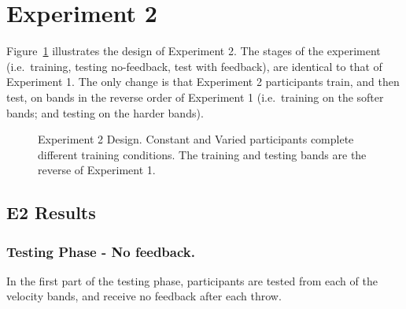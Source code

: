 \documentclass[
  letterpaper,
  DIV=11,
  numbers=noendperiod,
  oneside]{scrartcl}
\begin{document}
\section{Experiment 2}\label{experiment-2}

Figure~\ref{fig-design-e2} illustrates the design of Experiment 2. The
stages of the experiment (i.e.~training, testing no-feedback, test with
feedback), are identical to that of Experiment 1. The only change is
that Experiment 2 participants train, and then test, on bands in the
reverse order of Experiment 1 (i.e.~training on the softer bands; and
testing on the harder bands).

\begin{figure}


\caption{\label{fig-design-e2}Experiment 2 Design. Constant and Varied
participants complete different training conditions. The training and
testing bands are the reverse of Experiment 1.}

\end{figure}%

\subsection{E2 Results}\label{e2-results}

\subsubsection{Testing Phase - No
feedback.}\label{testing-phase---no-feedback.-1}

In the first part of the testing phase, participants are tested from
each of the velocity bands, and receive no feedback after each throw.
\end{document}
